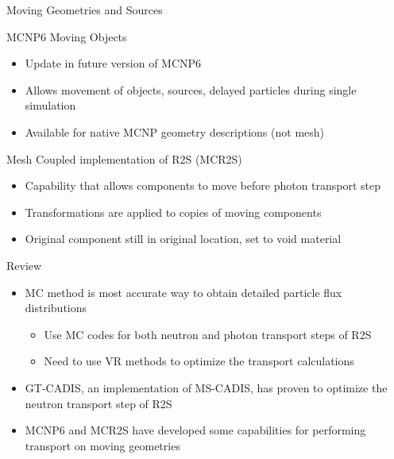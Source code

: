 \documentclass{beamer}
\begin{document}
\begin{frame}{Moving Geometries and Sources}
	\begin{block}{MCNP6 Moving Objects}
	\begin{itemize}
		\item{Update in future version of MCNP6}
		\item{Allows movement of objects, sources, delayed particles
			during single simulation}
		\item{Available for native MCNP geometry descriptions (not
			mesh)}
	\end{itemize}
	\end{block}
		\begin{block}{Mesh Coupled implementation of R2S (MCR2S)}
	\begin{itemize}
		\item{Capability that allows components to move before photon
			transport step}
		\item{Transformations are applied to copies of moving
			components}
		\item{Original component still in original location, set to void material}
	\end{itemize}
		\end{block}
\end{frame}

\begin{frame}{Review}
	\begin{itemize}
		\item{MC method is most accurate way to obtain detailed
			particle flux distributions}
			\begin{itemize}
          	  	  \item{Use MC codes for both neutron and photon transport steps
          	  	  	of R2S}
          	  	  \item{Need to use VR methods to optimize the transport
          	  	  	calculations}
          		\end{itemize}
		\item{GT-CADIS, an implementation of MS-CADIS,  has proven to optimize the neutron transport
			step of R2S}
		\item{MCNP6 and MCR2S have developed some capabilities for
			performing transport on moving geometries}
	\end{itemize}

\end{frame}
\end{document}
